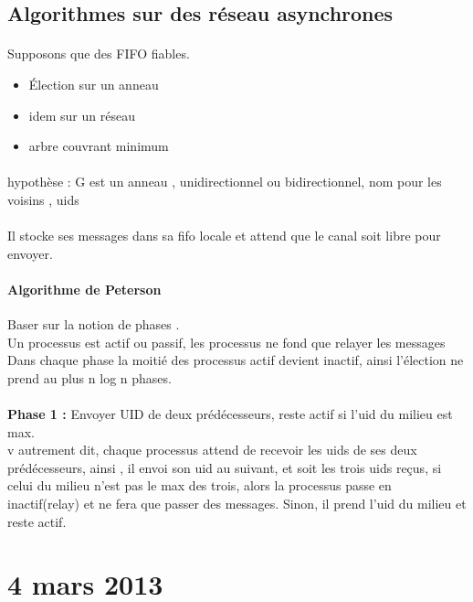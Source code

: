 \documentclass{article}
\begin{document}
\subsection{Algorithmes sur des réseau asynchrones}
\paragraph{}Supposons que des FIFO fiables.
\begin{itemize}
\item Élection sur un anneau
\item idem sur un réseau
\item arbre couvrant minimum
\end{itemize}

\paragraph{} hypothèse : G est un anneau , unidirectionnel ou bidirectionnel, nom pour les voisins , uids\\\\ Il stocke ses messages dans sa fifo locale et attend que le canal soit libre pour envoyer.
\paragraph{Algorithme de Peterson} Baser sur la notion de phases . \\ Un processus est actif ou passif, les processus ne fond que relayer les messages\\Dans chaque phase la moitié des processus actif devient inactif, ainsi l’élection ne prend au plus n log n phases.\\\\\textbf{Phase 1 : } Envoyer UID de deux prédécesseurs, reste actif si l'uid du milieu est max.\\v autrement dit, chaque processus attend de recevoir les uids de ses deux prédécesseurs, ainsi , il envoi son uid au suivant, et soit les trois uids reçus, si celui du milieu n'est pas le max des trois, alors la processus passe en inactif(relay) et ne fera que passer des messages. Sinon, il prend l'uid du milieu et reste actif.\\

\section{4 mars 2013}
\end{document}

